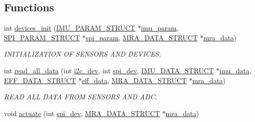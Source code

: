 \subsection*{Functions}
\begin{DoxyCompactItemize}
\item 
int \hyperlink{communication_01_07C_xC3_xB3pia_01em_01conflito_01de_01Caio_01Gustavo_01Mesquita_01Angelo_012013-04-28_08_8c_a2d1e523ff70db11ca4096f97af5da000}{devices\-\_\-init} (\hyperlink{structIMU__PARAM__STRUCT}{I\-M\-U\-\_\-\-P\-A\-R\-A\-M\-\_\-\-S\-T\-R\-U\-C\-T} $\ast$\hyperlink{main2_8c_a9c6b2109fb9402446f92995db60951b5}{imu\-\_\-param}, \hyperlink{structSPI__PARAM__STRUCT}{S\-P\-I\-\_\-\-P\-A\-R\-A\-M\-\_\-\-S\-T\-R\-U\-C\-T} $\ast$\hyperlink{main2_8c_adec2468b88cf50b20e5cf399a3b7e994}{spi\-\_\-param}, \hyperlink{structMRA__DATA__STRUCT}{M\-R\-A\-\_\-\-D\-A\-T\-A\-\_\-\-S\-T\-R\-U\-C\-T} $\ast$\hyperlink{main2_8c_abc42e18d2909e9bc119316283f4ed9db}{mra\-\_\-data})
\begin{DoxyCompactList}\small\item\em I\-N\-I\-T\-I\-A\-L\-I\-Z\-A\-T\-I\-O\-N O\-F S\-E\-N\-S\-O\-R\-S A\-N\-D D\-E\-V\-I\-C\-E\-S. \end{DoxyCompactList}\item 
int \hyperlink{communication_01_07C_xC3_xB3pia_01em_01conflito_01de_01Caio_01Gustavo_01Mesquita_01Angelo_012013-04-28_08_8c_a5f0316a5f70c7e369541e996802603b4}{read\-\_\-all\-\_\-data} (int \hyperlink{CommunicationV0_2communication_8c_a7751bd45ac1064efb35adf1f19c25db8}{i2c\-\_\-dev}, int \hyperlink{CommunicationV0_2communication_8c_a4788f0a5355494bc6c13690e28f43783}{spi\-\_\-dev}, \hyperlink{structIMU__DATA__STRUCT}{I\-M\-U\-\_\-\-D\-A\-T\-A\-\_\-\-S\-T\-R\-U\-C\-T} $\ast$\hyperlink{threads__linux_8c_a3cfea12cbe9ca7f1681c950e4cd68606}{imu\-\_\-data}, \hyperlink{structEFF__DATA__STRUCT}{E\-F\-F\-\_\-\-D\-A\-T\-A\-\_\-\-S\-T\-R\-U\-C\-T} $\ast$\hyperlink{main2_8c_a5650ece8c3a277c7f158d75ae65265fa}{eff\-\_\-data}, \hyperlink{structMRA__DATA__STRUCT}{M\-R\-A\-\_\-\-D\-A\-T\-A\-\_\-\-S\-T\-R\-U\-C\-T} $\ast$\hyperlink{main2_8c_abc42e18d2909e9bc119316283f4ed9db}{mra\-\_\-data})
\begin{DoxyCompactList}\small\item\em R\-E\-A\-D A\-L\-L D\-A\-T\-A F\-R\-O\-M S\-E\-N\-S\-O\-R\-S A\-N\-D A\-D\-C. \end{DoxyCompactList}\item 
void \hyperlink{communication_01_07C_xC3_xB3pia_01em_01conflito_01de_01Caio_01Gustavo_01Mesquita_01Angelo_012013-04-28_08_8c_a1d5f01d0124cff7030b5c4951b4bbefa}{actuate} (int \hyperlink{CommunicationV0_2communication_8c_a4788f0a5355494bc6c13690e28f43783}{spi\-\_\-dev}, \hyperlink{structMRA__DATA__STRUCT}{M\-R\-A\-\_\-\-D\-A\-T\-A\-\_\-\-S\-T\-R\-U\-C\-T} $\ast$\hyperlink{main2_8c_abc42e18d2909e9bc119316283f4ed9db}{mra\-\_\-data})

\end{DoxyCompactItemize}

